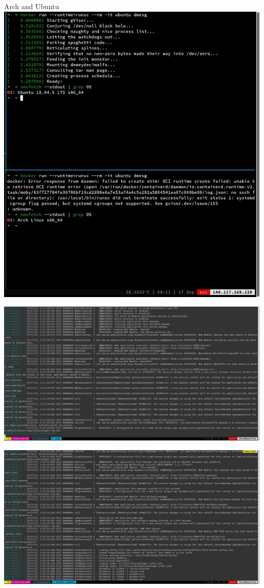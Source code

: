 \documentclass{beamer}
\begin{document}
\begin{CJK*}{UTF8}{bsmi}
  \begin{frame}{Arch and Ubuntu}
    \centering
    \includegraphics[height=.95\textheight]{photo_2021-09-17_15-59-52.jpg}
  \end{frame}

  \begin{frame}
    \includegraphics[width=\textwidth]{photo_2021-09-17_16-01-14.jpg}
  \end{frame}

  \begin{frame}
    \includegraphics[width=\textwidth]{photo_2021-09-17_16-16-15.jpg}
  \end{frame}


\end{CJK*}
\end{document}
